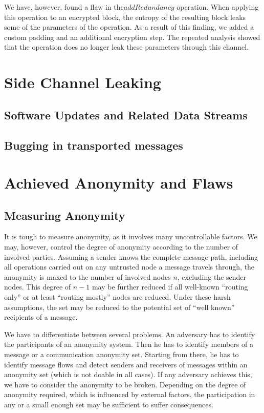 We have, however, found a flaw in the$addRedundancy$ operation. When applying this operation to an encrypted block, the entropy of the resulting block leaks some of the parameters of the operation. As a result of this finding, we added a custom padding and an additional encryption step. The repeated analysis showed that the operation does no longer leak these parameters through this channel.

\section{Side Channel Leaking}

\subsection{Software Updates and Related Data Streams}

\subsection{Bugging in transported messages}

\section{Achieved Anonymity and Flaws}
\subsection{Measuring Anonymity}
It is tough to measure anonymity, as it involves many uncontrollable factors. We may, however, control the degree of anonymity according to the number of involved parties. Assuming a sender knows the complete message path, including all operations carried out on any untrusted node a message travels through, the anonymity is maxed to the number of involved nodes $n$, excluding the sender nodes. This degree of $n-1$ may be further reduced if all well-known ``routing only'' or at least ``routing mostly'' nodes are reduced. Under these harsh assumptions, the set may be reduced to the potential set of ``well known'' recipients of a message.

We have to differentiate between several problems. An adversary has to identify the participants of an anonymity system. Then he has to identify members of a message or a communication anonymity set. Starting from there, he has to identify message flows and detect senders and receivers of messages within an anonymity set (which is not doable in all cases). If any adversary achieves this, we have to consider the anonymity to be broken. Depending on the degree of anonymity required, which is influenced by external factors, the participation in any or a small enough set may be sufficient to suffer consequences.

